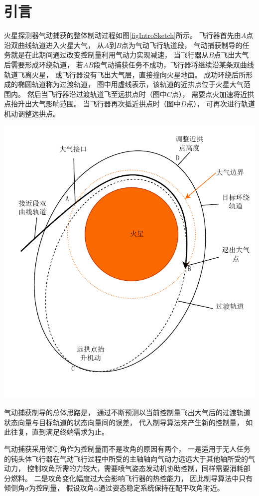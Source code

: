 \section{引\quad 言}
火星探测器气动捕获的整体制动过程如图\ref{figIntroSketch}所示。
飞行器首先由$A$点沿双曲线轨道进入火星大气，
从$A$到$B$点为气动飞行轨道段，
气动捕获制导的任务就是在此期间通过改变控制量利用气动力实现减速，
当飞行器从$B$点飞出大气后需要形成环绕轨道，
若$AB$段气动捕获任务不成功，飞行器将继续沿某条双曲线轨道飞离火星，
或飞行器没有飞出大气层，直接撞向火星地面。
成功环绕后所形成的椭圆轨道称为过渡轨道，
图中用虚线表示，该轨道的近拱点位于火星大气范围内。
然后当飞行器沿过渡轨道飞至远拱点时（图中$C$点），
需要点火加速将近拱点抬升出大气影响范围。
当飞行器再次抵近拱点时（图中$D$点），
可再次进行轨道机动调整远拱点。
\begin{center}
	\includegraphics[scale=0.8]{IntroSketch.pdf}  \\
	 \label{figIntroSketch}
\end{center}

气动捕获制导的总体思路是，
通过不断预测以当前控制量飞出大气后的过渡轨道状态向量与目标轨道的状态向量间的误差，
代入制导算法来产生新的控制量，
如此往复，直到满足终端需求为止。

气动捕获采用倾侧角作为控制量而不是攻角的原因有两个，
一是适用于无人任务的钝头体飞行器在气动飞行过程中所受的主轴轴向气动力远远大于其他轴所受的气动力，
控制攻角所需的力较大，需要喷气姿态发动机协助控制，同样需要消耗部分燃料。
二是攻角变化幅度过大会影响飞行器的热控能力，
因此制导算法中只有倾侧角$\sigma$为控制量，
假设攻角$\alpha$通过姿态稳定系统保持在配平攻角附近。
